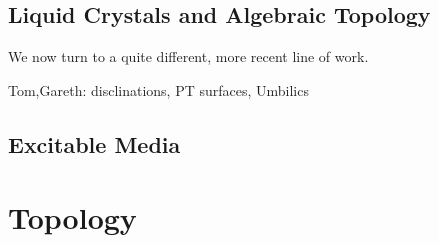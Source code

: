 \subsection{Liquid Crystals and Algebraic Topology}
We now turn to a quite different, more recent line of work.

Tom,Gareth: disclinations, PT surfaces, Umbilics

\subsection{Excitable Media}

\section{Topology}



